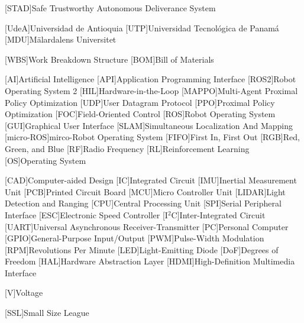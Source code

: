 
[STAD]{Safe Trustworthy Autonomous Deliverance System}

[UdeA]{Universidad de Antioquia}
[UTP]{Universidad Tecnológica de Panamá}
[MDU]{Mälardalens Universitet}

[WBS]{Work Breakdown Structure}
[BOM]{Bill of Materials}

[AI]{Artificial Intelligence}
[API]{Application Programming Interface}
[ROS2]{Robot Operating System 2}
[HIL]{Hardware-in-the-Loop}
[MAPPO]{Multi-Agent Proximal Policy Optimization}
[UDP]{User Datagram Protocol}
[PPO]{Proximal Policy Optimization}
[FOC]{Field-Oriented Control}
[ROS]{Robot Operating System}
[GUI]{Graphical User Interface}
[SLAM]{Simultaneous Localization And Mapping}
[micro-ROS]{mirco-Robot Operating System}
[FIFO]{First In, First Out}
[RGB]{Red, Green, and Blue}
[RF]{Radio Frequency}
[RL]{Reinforcement Learning}
[OS]{Operating System}

[CAD]{Computer-aided Design}
[IC]{Integrated Circuit}
[IMU]{Inertial Measurement Unit}
[PCB]{Printed Circuit Board}
[MCU]{Micro Controller Unit}
[LIDAR]{Light Detection and Ranging}
[CPU]{Central Processing Unit}
[SPI]{Serial Peripheral Interface}
[ESC]{Electronic Speed Controller}
[I$^2$C]{Inter-Integrated Circuit}
[UART]{Universal Asynchronous Receiver-Transmitter}
[PC]{Personal Computer}
[GPIO]{General-Purpose Input/Output}
[PWM]{Pulse-Width Modulation}
[RPM]{Revolutions Per Minute}
[LED]{Light-Emitting Diode}
[DoF]{Degrees of Freedom}
[HAL]{Hardware Abstraction Layer}
[HDMI]{High-Definition Multimedia Interface}

[V]{Voltage}

[SSL]{Small Size League}

